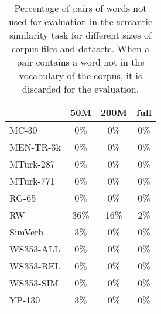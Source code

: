     \begin{table}[h]
      \centering
      \begin{tabular}{lccc}
                    & 50M & 200M & full\\
        \toprule[0.1em]
          MC-30     & 0\% & 0\%  & 0\% \\
          MEN-TR-3k & 0\% & 0\%  & 0\% \\
          MTurk-287 & 0\% & 0\%  & 0\% \\
          MTurk-771 & 0\% & 0\%  & 0\% \\
          RG-65     & 0\% & 0\%  & 0\% \\
          RW        & 36\%& 16\% & 2\% \\
          SimVerb   & 3\% & 0\%  & 0\% \\
          WS353-ALL & 0\% & 0\%  & 0\% \\
          WS353-REL & 0\% & 0\%  & 0\% \\
          WS353-SIM & 0\% & 0\%  & 0\% \\
          YP-130    & 3\% & 0\%  & 0\% \\
        \bottomrule[0.1em]
      \end{tabular}
      \caption[Percentage of pairs of words not evaluated in the semantic
      similary task.]{Percentage of pairs of words not used for evaluation in
      the semantic similarity task for different sizes of corpus files and
      datasets. When a pair contains a word not in the vocabulary of the corpus,
      it is discarded for the evaluation.}
      \label{ch05:tab:oov}
    \end{table}

